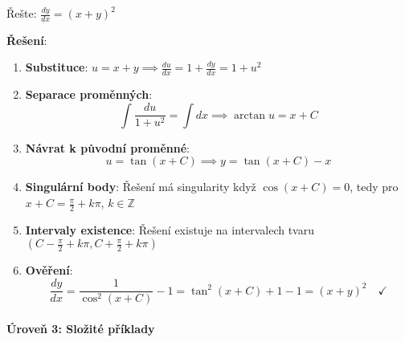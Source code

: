 \begin{example}
    Řešte: $\frac{dy}{dx} = (x + y)^2$
    
    \vspace{0.3\baselineskip}
    
    \textbf{Řešení}: 
    \begin{enumerate}
    \item \textbf{Substituce}: $u = x + y \implies \frac{du}{dx} = 1 + \frac{dy}{dx} = 1 + u^2$
    
    \item \textbf{Separace proměnných}:
    \[
    \int \frac{du}{1 + u^2} = \int dx \implies \arctan u = x + C
    \]
    
    \item \textbf{Návrat k původní proměnné}:
    \[
    u = \tan(x + C) \implies y = \tan(x + C) - x
    \]
    
    \item \textbf{Singulární body}: Řešení má singularity když $\cos(x + C) = 0$, tedy pro $x + C = \frac{\pi}{2} + k\pi$, $k \in \mathbb{Z}$
    
    \item \textbf{Intervaly existence}: Řešení existuje na intervalech tvaru $\left(C - \frac{\pi}{2} + k\pi, C + \frac{\pi}{2} + k\pi\right)$
    
    \item \textbf{Ověření}:
    \[
    \frac{dy}{dx} = \frac{1}{\cos^2(x + C)} - 1 = \tan^2(x + C) + 1 - 1 = (x + y)^2 \quad \checkmark
    \]
    \end{enumerate}
    \end{example}

\vspace{0.8\baselineskip}

\paragraph*{Úroveň 3: Složité příklady}

